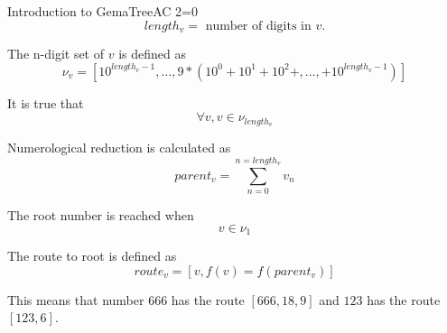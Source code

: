 \documentclass[a4paper,10pt]{article}
\begin{document}
\begin{section}{Introduction to GemaTreeAC 2=0}
     \[
     length_v = \textrm{ number of digits in } v.
     \]

     The n-digit set of $v$ is defined as
     \[
     \nu_v = [10^{length_v-1}, ... , 9*(10^0 + 10^1 + 10^2 +, ..., + 10^{length_v-1})]
     \]

     It is true that
     \[
     \forall v, v \in \nu_{length_v}
     \]

     Numerological reduction is calculated as
     \[
     parent_v = \sum_{n=0}^{n=length_v}v_n
     \]

     The root number is reached when
     \[
     v \in \nu_1
     \]

     The route to root is defined as
     \[
     route_v = [v, f(v)=f(parent_v)]
     \]

     This means that number $666$ has the route $[666, 18, 9]$ and $123$ has the route $[123, 6]$.
     
   \end{section}
\end{document}
